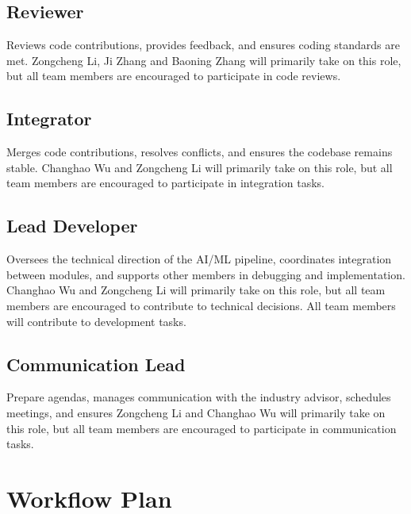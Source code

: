 \documentclass{article}
\begin{document}
\subsection*{Reviewer}
Reviews code contributions, provides feedback, and ensures coding standards are met.
Zongcheng Li, Ji Zhang and Baoning Zhang will primarily take on this role, but all team members are encouraged to participate in code reviews.

\subsection*{Integrator}
Merges code contributions, resolves conflicts, and ensures the codebase remains stable.
Changhao Wu and Zongcheng Li will primarily take on this role, but all team members are encouraged to participate in integration tasks.

\subsection*{Lead Developer}
Oversees the technical direction of the AI/ML pipeline, coordinates integration 
between modules, and supports other members in debugging and implementation.
Changhao Wu and Zongcheng Li will primarily take on this role, but all team members are encouraged to contribute to technical decisions.
All team members will contribute to development tasks.

\subsection*{Communication Lead}
Prepare agendas, manages communication with the industry advisor, schedules meetings, and ensures
Zongcheng Li and Changhao Wu will primarily take on this role, but all team members are encouraged to participate in communication tasks.

\section{Workflow Plan}
\end{document}
